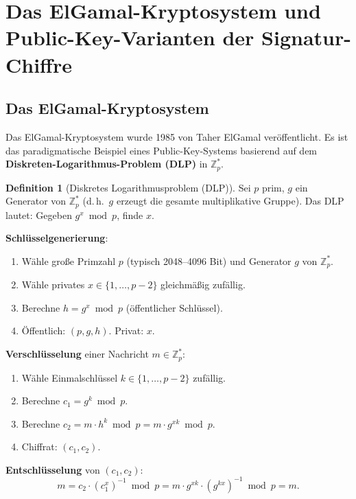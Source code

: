 ﻿\documentclass[a4paper,12pt]{scrreprt}
\theoremstyle{definition}
\newtheorem{definition}{Definition}[section]
\begin{document}
\section{Das ElGamal-Kryptosystem und Public-Key-Varianten der Signatur-Chiffre}

\subsection{Das ElGamal-Kryptosystem}

Das ElGamal-Kryptosystem wurde 1985 von Taher ElGamal \cite{ElG85} veröffentlicht. Es ist das paradigmatische Beispiel eines Public-Key-Systems basierend auf dem \textbf{Diskreten-Logarithmus-Problem (DLP)} in $\mathbb{Z}_p^*$.

\begin{definition}[Diskretes Logarithmusproblem (DLP)]
Sei $p$ prim, $g$ ein Generator von $\mathbb{Z}_p^*$ (d.\,h.\ $g$ erzeugt die gesamte multiplikative Gruppe). Das DLP lautet: Gegeben $g^x \bmod p$, finde $x$.
\end{definition}

\textbf{Schlüsselgenerierung}:
\begin{enumerate}
    \item Wähle große Primzahl $p$ (typisch 2048--4096 Bit) und Generator $g$ von $\mathbb{Z}_p^*$.
    \item Wähle privates $x \in \{1,\ldots,p-2\}$ gleichmäßig zufällig.
    \item Berechne $h = g^x \bmod p$ (öffentlicher Schlüssel).
    \item Öffentlich: $(p, g, h)$. Privat: $x$.
\end{enumerate}

\textbf{Verschlüsselung} einer Nachricht $m \in \mathbb{Z}_p^*$:
\begin{enumerate}
    \item Wähle Einmalschlüssel $k \in \{1,\ldots,p-2\}$ zufällig.
    \item Berechne $c_1 = g^k \bmod p$.
    \item Berechne $c_2 = m \cdot h^k \bmod p = m \cdot g^{xk} \bmod p$.
    \item Chiffrat: $(c_1, c_2)$.
\end{enumerate}

\textbf{Entschlüsselung} von $(c_1, c_2)$:
\[
m = c_2 \cdot (c_1^x)^{-1} \bmod p = m \cdot g^{xk} \cdot (g^{kx})^{-1} \bmod p = m.
\]
\end{document}
